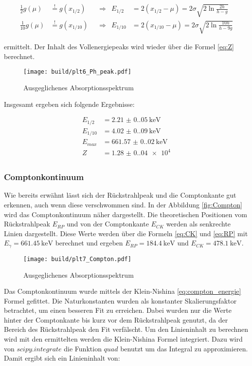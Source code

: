 \begin{align*}
	\frac{1}{2}g(\mu)  & \stackrel{!}{=}g(x_{1/2})  &  & \Rightarrow & E_{1/2}  & =2(x_{1/2}-\mu)=2\sigma \sqrt{2 \ln{\frac{2h}{h-g}}}    \\
	\frac{1}{10}g(\mu) & \stackrel{!}{=}g(x_{1/10}) &  & \Rightarrow & E_{1/10} & =2(x_{1/10}-\mu)=2\sigma \sqrt{2 \ln{\frac{10h}{h-9g}}}
\end{align*}

ermittelt. Der Inhalt des Vollenergiepeaks wird wieder über die Formel
\eqref{eq:Z} berechnet.

\begin{figure}[H]
	\centering
	\texttt{[image: build/plt6\_Ph\_peak.pdf]}
	\caption{Ausgeglichenes Absorptionsspektrum}
	\label{fig:Cs_peak}
\end{figure}

Insgesamt ergeben sich folgende Ergebnisse:

\begin{align*}
	E_{1/2}  & =\qty{2.21(0.05)}{\kilo\eV}   \\
	E_{1/10} & =\qty{4.02(0.09)}{\kilo\eV}   \\
	E_{max}  & =\qty{661.57(0.02)}{\kilo\eV} \\
	Z        & =\num{1.28(0.04)e4}           \\
\end{align*}

\subsubsection{Comptonkontinuum}
Wie bereits erwähnt lässt sich der Rückstrahlpeak und die Comptonkante gut
erkennen, auch wenn diese verschwommen sind. In der Abbildung
\eqref{fig:Compton} wird das Comptonkontinuum näher dargestellt. Die
theoretischen Positionen vom Rückstrahlpeak $E_{RP}$ und von der Comptonkante
$E_{CK}$ werden als senkrechte Linien dargestellt. Diese Werte werden über die
Formeln \eqref{eq:CK} und \eqref{eq:RP} mit $E_{\gamma}=\qty{661.45}{\kilo\eV}$ berechnet und
ergeben $E_{RP}=\qty{184.4}{\kilo\eV}$ und $E_{CK}=\qty{478.1}{\kilo\eV}$.

\begin{figure}[H]
	\centering
	\texttt{[image: build/plt7\_Compton.pdf]}
	\caption{Ausgeglichenes Absorptionsspektrum}
	\label{fig:Compton}
\end{figure}

Das Comptonkontinuum wurde mittels der Klein-Nishina \eqref{eq:compton_energie} Formel gefittet.
Die Naturkonstanten wurden als konstanter Skalierungsfaktor betrachtet, um einen besseren Fit zu erreichen. 
Dabei wurden nur die Werte hinter der Comptonkante bis kurz vor dem Rückstrahlpeak genutzt, 
da der Bereich des Rückstrahlpeak den Fit verfälscht. 
Um den Linieninhalt zu berechnen wird mit den ermittelten werden die Klein-Nishina Formel integriert. 
Dazu wird von $scipy.integrate$ \cite{scipy} die Funktion $quad$ benutzt um das Integral zu approximieren. 
Damit ergibt sich ein Linieninhalt von:


